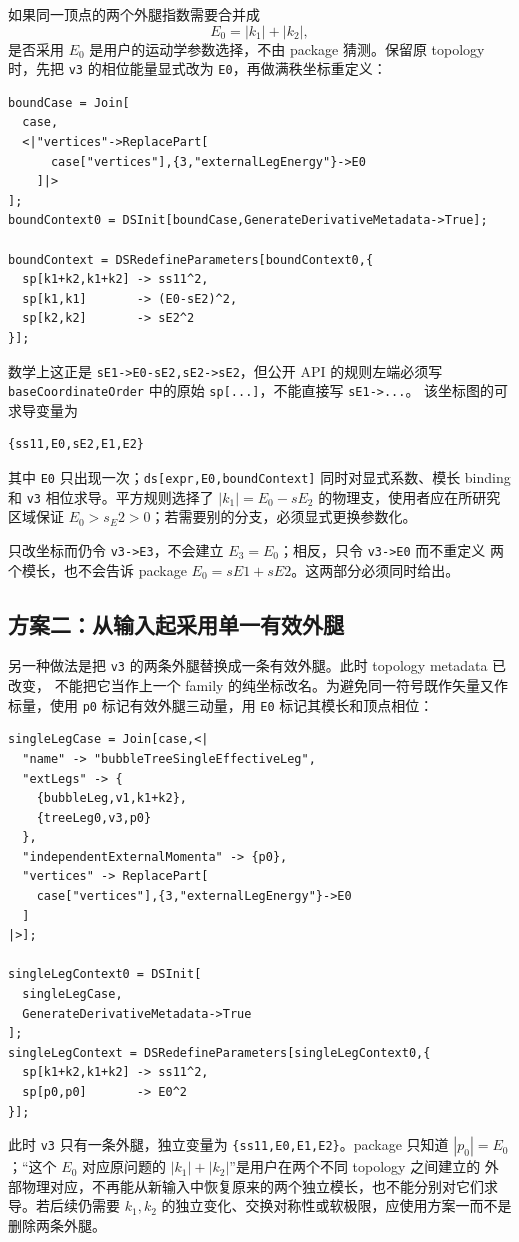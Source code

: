 ﻿\documentclass[a4paper,11pt]{article}
\begin{document}
如果同一顶点的两个外腿指数需要合并成
\begin{equation}
 E_0=|k_1|+|k_2|,
\end{equation}
是否采用 $E_0$ 是用户的运动学参数选择，不由 package 猜测。保留原 topology 时，先把
\texttt{v3} 的相位能量显式改为 \texttt{E0}，再做满秩坐标重定义：
\begin{verbatim}
boundCase = Join[
  case,
  <|"vertices"->ReplacePart[
      case["vertices"],{3,"externalLegEnergy"}->E0
    ]|>
];
boundContext0 = DSInit[boundCase,GenerateDerivativeMetadata->True];

boundContext = DSRedefineParameters[boundContext0,{
  sp[k1+k2,k1+k2] -> ss11^2,
  sp[k1,k1]       -> (E0-sE2)^2,
  sp[k2,k2]       -> sE2^2
}];
\end{verbatim}
数学上这正是 \texttt{sE1->E0-sE2,sE2->sE2}，但公开 API 的规则左端必须写
\texttt{baseCoordinateOrder} 中的原始 \texttt{sp[...]}，不能直接写 \texttt{sE1->...}。
该坐标图的可求导变量为
\begin{verbatim}
{ss11,E0,sE2,E1,E2}
\end{verbatim}
其中 \texttt{E0} 只出现一次；\texttt{ds[expr,E0,boundContext]} 同时对显式系数、模长 binding
和 \texttt{v3} 相位求导。平方规则选择了 $|k_1|=E_0-sE_2$ 的物理支，使用者应在所研究区域保证
$E_0>s_E2>0$；若需要别的分支，必须显式更换参数化。

只改坐标而仍令 \texttt{v3->E3}，不会建立 $E_3=E_0$；相反，只令 \texttt{v3->E0} 而不重定义
两个模长，也不会告诉 package $E_0=sE1+sE2$。这两部分必须同时给出。

\subsection{方案二：从输入起采用单一有效外腿}

另一种做法是把 \texttt{v3} 的两条外腿替换成一条有效外腿。此时 topology metadata 已改变，
不能把它当作上一个 family 的纯坐标改名。为避免同一符号既作矢量又作标量，使用 \texttt{p0}
标记有效外腿三动量，用 \texttt{E0} 标记其模长和顶点相位：
\begin{verbatim}
singleLegCase = Join[case,<|
  "name" -> "bubbleTreeSingleEffectiveLeg",
  "extLegs" -> {
    {bubbleLeg,v1,k1+k2},
    {treeLeg0,v3,p0}
  },
  "independentExternalMomenta" -> {p0},
  "vertices" -> ReplacePart[
    case["vertices"],{3,"externalLegEnergy"}->E0
  ]
|>];

singleLegContext0 = DSInit[
  singleLegCase,
  GenerateDerivativeMetadata->True
];
singleLegContext = DSRedefineParameters[singleLegContext0,{
  sp[k1+k2,k1+k2] -> ss11^2,
  sp[p0,p0]       -> E0^2
}];
\end{verbatim}
此时 \texttt{v3} 只有一条外腿，独立变量为 \texttt{\{ss11,E0,E1,E2\}}。package 只知道
$|p_0|=E_0$；“这个 $E_0$ 对应原问题的 $|k_1|+|k_2|$”是用户在两个不同 topology 之间建立的
外部物理对应，不再能从新输入中恢复原来的两个独立模长，也不能分别对它们求导。若后续仍需要
$k_1,k_2$ 的独立变化、交换对称性或软极限，应使用方案一而不是删除两条外腿。
\end{document}
